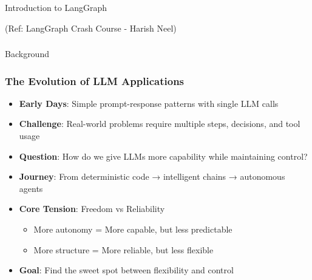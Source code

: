 \begin{frame}[fragile]\frametitle{}
\begin{center}
{\Large Introduction to LangGraph}

{\tiny (Ref: LangGraph Crash Course - Harish Neel)}
\end{center}
\end{frame}
\begin{frame}[fragile]\frametitle{}
\begin{center}
{\Large Background}
\end{center}
\end{frame}
\begin{frame}[fragile]\frametitle{The Evolution of LLM Applications}
      \begin{itemize}
        \item \textbf{Early Days}: Simple prompt-response patterns with single LLM calls
        \item \textbf{Challenge}: Real-world problems require multiple steps, decisions, and tool usage
        \item \textbf{Question}: How do we give LLMs more capability while maintaining control?
        \item \textbf{Journey}: From deterministic code → intelligent chains → autonomous agents
        \item \textbf{Core Tension}: Freedom vs Reliability
        \begin{itemize}
            \item More autonomy = More capable, but less predictable
            \item More structure = More reliable, but less flexible
        \end{itemize}
        \item \textbf{Goal}: Find the sweet spot between flexibility and control
      \end{itemize}
\end{frame}
